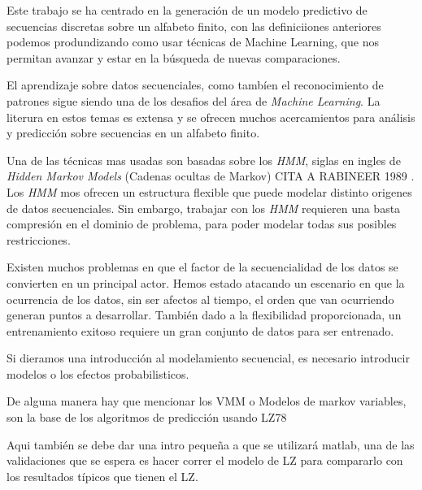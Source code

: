 Este trabajo se ha centrado en la generación de un modelo predictivo de secuencias discretas sobre un alfabeto finito, con las definiciiones anteriores podemos produndizando como usar técnicas de Machine Learning, que nos permitan avanzar y estar en la búsqueda de nuevas comparaciones.

El aprendizaje sobre datos secuenciales, como tambíen el reconocimiento de patrones sigue siendo una de los desafios del área de \emph{Machine Learning}.
La literura en estos temas es extensa y se ofrecen muchos acercamientos para análisis y predicción sobre secuencias en un alfabeto finito.

Una de las técnicas mas usadas son basadas sobre los \emph{HMM}, siglas en ingles de \emph{Hidden Markov Models} (Cadenas ocultas de Markov) CITA A RABINEER 1989 . Los \emph{HMM} mos ofrecen un estructura flexible que puede modelar distinto origenes de datos secuenciales. Sin embargo, trabajar con los \emph{HMM} requieren una basta compresión en el dominio de problema, para poder modelar todas sus posibles restricciones.


Existen muchos problemas en que el factor de la secuencialidad de los datos se convierten en un principal actor. Hemos estado atacando un escenario en que la ocurrencia de los datos, sin ser afectos al tiempo, el orden que van ocurriendo generan puntos a desarrollar. También dado a la flexibilidad proporcionada, un entrenamiento exitoso requiere un gran conjunto de datos para ser entrenado.

 




Si dieramos una introducción al modelamiento secuencial, es necesario introducir modelos o los efectos probabilisticos.


De alguna manera hay que mencionar los VMM o Modelos de markov variables, son la base de los algoritmos de predicción usando LZ78



Aqui también se debe dar una intro pequeña a que se utilizará matlab, una de las validaciones que se espera es hacer correr el modelo de LZ para compararlo con los resultados típicos que tienen el LZ.

